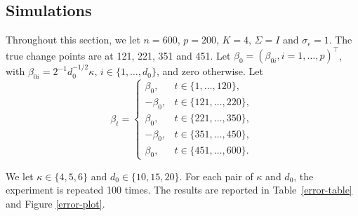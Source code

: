 \documentclass[twoside]{article}
\begin{document}
\subsection{Simulations}

Throughout this section, we let $n = 600$, $p = 200$, $K = 4$, $\Sigma = I$ and $\sigma_{\epsilon} = 1$. The true change points are at 121, 221, 351 and 451.  Let $\beta_0 = (\beta_{0i}, i = 1, \ldots, p)^{\top}$, with $\beta_{0i} = 2^{-1}d_0^{-1/2}\kappa$, $i \in \{1, \ldots, d_0\}$, and zero otherwise.  Let
    \[
        \beta_t = \begin{cases} 
            \beta_0, & t \in \{1, \ldots, 120\}, \\
            -\beta_0, & t \in \{121, \ldots, 220\}, \\
            \beta_0, & t \in \{221, \ldots, 350\}, \\
            -\beta_0, & t \in \{351, \ldots, 450\},  \\
            \beta_0, & t \in \{451, \ldots, 600\}.
        \end{cases}
    \] 
    
We let $\kappa \in \{4, 5, 6\}$ and $d_0 \in \{10, 15, 20\}$.  For each pair of $\kappa$ and $d_0$, the experiment is repeated 100 times.  The results are reported in Table~\ref{error-table} and Figure \ref{error-plot}.
\end{document}
